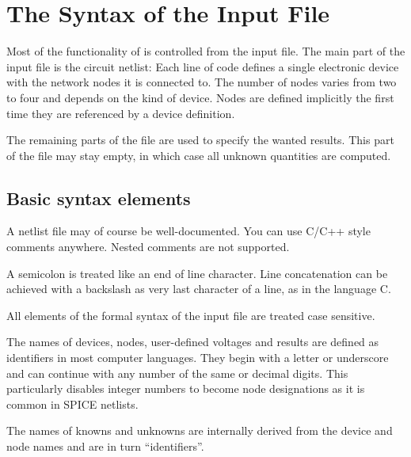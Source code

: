 \chapter{The Syntax of the Input File}

Most of the functionality of \linnet{} is controlled from the input file.
The main part of the input file is the circuit netlist: Each line of code
defines a single electronic device with the network nodes it is connected
to. The number of nodes varies from two to four and depends on the kind of
device. Nodes are defined implicitly the first time they are referenced by
a device definition.

The remaining parts of the file are used to specify the wanted results.
This part of the file may stay empty, in which case all unknown quantities
are computed.


\section{Basic syntax elements}

A netlist file may of course be well-documented. You can use C/C++ style
comments anywhere. Nested comments are not supported.

A semicolon is treated like an end of line character. Line concatenation
can be achieved with a backslash as very last character of a line, as in
the language C.

All elements of the formal syntax of the input file are treated case
sensitive.

The names of devices, nodes, user-defined voltages and results are defined
as identifiers in most computer languages. They begin with a letter or
underscore and can continue with any number of the same or decimal digits.
This particularly disables integer numbers to become node designations as
it is common in SPICE netlists.

The names of knowns and unknowns are internally derived from the device
and node names and are in turn ``identifiers''. 


